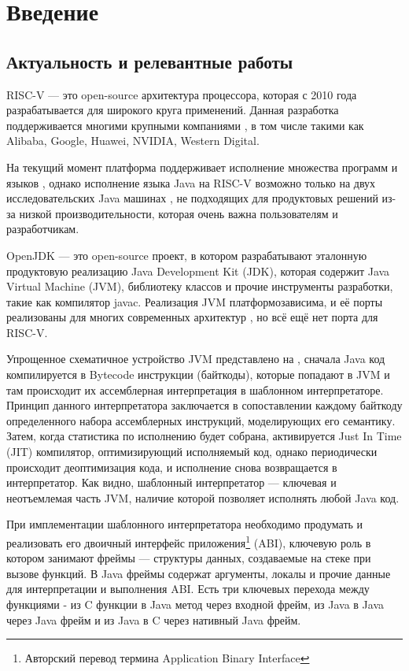 \section*{Введение}
\renewcommand{\thefigure}{\arabic{figure}}
\subsection*{Актуальность и релевантные работы}

RISC-V --- это open-source архитектура процессора, которая с 2010 года разрабатывается для широкого круга применений. Данная разработка поддерживается многими крупными компаниями \cite{riscv:members}, в том числе такими как Alibaba, Google, Huawei, NVIDIA, Western Digital.

На текущий момент платформа поддерживает исполнение множества программ и языков \cite{riscv:soft}, однако исполнение языка Java на RISC-V возможно только на двух исследовательских Java машинах \cite{jikes, maxine}, не подходящих для продуктовых решений из-за низкой производительности, которая очень важна пользователям и разработчикам.

OpenJDK --- это open-source проект, в котором разрабатывают эталонную \cite{openjdk_reference, openjdk:FAQ} продуктовую реализацию Java Development Kit (JDK), которая содержит Java Virtual Machine (JVM), библиотеку классов и прочие инструменты разработки, такие как компилятор javac. Реализация JVM платформозависима, и её порты реализованы для многих современных архитектур \cite{openjdk:platforms}, но всё ещё нет порта для RISC-V.


Упрощенное схематичное устройство JVM представлено на , сначала Java код компилируется в Bytecode инструкции (байткоды), которые попадают в JVM и там происходит их ассемблерная интерпретация в шаблонном интерпретаторе. Принцип данного интерпретатора заключается в сопоставлении каждому байткоду определенного набора ассемблерных инструкций, моделирующих его семантику. Затем, когда статистика по исполнению будет собрана, активируется Just In Time (JIT) компилятор, оптимизирующий исполняемый код, однако периодически происходит деоптимизация кода, и исполнение снова возвращается в интерпретатор. Как видно, шаблонный интерпретатор --- ключевая и неотъемлемая часть JVM, наличие которой позволяет исполнять любой Java код.

При имплементации шаблонного интерпретатора необходимо продумать и реализовать его двоичный интерфейс приложения\footnote{Авторский перевод термина Application Binary Interface} (ABI), ключевую роль в котором занимают фреймы --- структуры данных, создаваемые на стеке при вызове функций. В Java фреймы содержат аргументы, локалы и прочие данные для интерпретации и выполнения ABI. Есть три ключевых перехода между функциями - из C функции в Java метод через входной фрейм, из Java в Java через Java фрейм и из Java в C через нативный Java фрейм.



